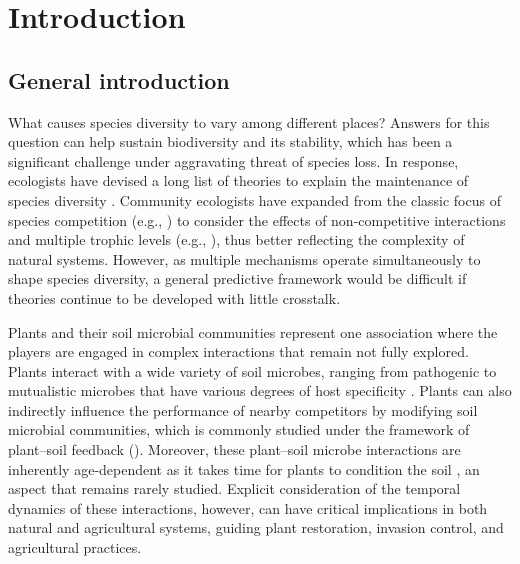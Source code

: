 \chapter{Introduction}
\fancyhead[LE, RO]{\thepage}
\fancyfoot{}
\renewcommand{\headrulewidth}{0pt}
\setlength{\parindent}{1cm}


\section{General introduction}
What causes species diversity to vary among different places? Answers for this question can help sustain biodiversity and its stability, which has been a significant challenge under aggravating threat of species loss. In response, ecologists have devised a long list of theories to explain the maintenance of species diversity \citep{Vellend2016}. Community ecologists have expanded from the classic focus of species competition (e.g., \citealp{Gause1934}) to consider the effects of non-competitive interactions and multiple trophic levels (e.g., \citealp{Chesson2008b, Mccann2011, Bascompte2013}), thus better reflecting the complexity of natural systems. However, as multiple mechanisms operate simultaneously to shape species diversity, a general predictive framework would be difficult if theories continue to be developed with little crosstalk.
\par


Plants and their soil microbial communities represent one association where the players are engaged in complex interactions that remain not fully explored. Plants interact with a wide variety of soil microbes, ranging from pathogenic to mutualistic microbes that have various degrees of host specificity \citep{Bever2010, Bever2012, vanderPutten2013}. Plants can also indirectly influence the performance of nearby competitors by modifying soil microbial communities, which is commonly studied under the framework of plant--soil feedback (\citealp{Bever1997, Bever2003}).
Moreover, these plant--soil microbe interactions are inherently age-dependent as it takes time for plants to condition the soil \citep{Kardol2013}, an aspect that remains rarely studied. Explicit consideration of the temporal dynamics of these interactions, however, can have critical implications in both natural and agricultural systems, guiding plant restoration, invasion control, and agricultural practices.
\par 


